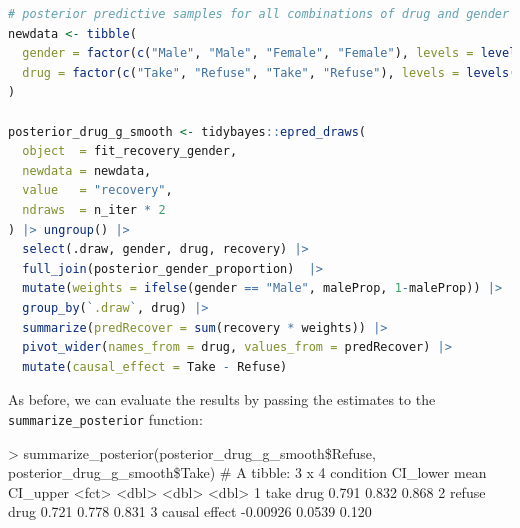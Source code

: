 \documentclass[nobib]{tufte-handout}
\newcommand{\ri}[1]{\mbox{\lstinline{#1}}\xspace}  %
\begin{document}
\begin{minipage}[]{\textwidth}
\begin{lstlisting}[language=R]
# posterior predictive samples for all combinations of drug and gender
newdata <- tibble(
  gender = factor(c("Male", "Male", "Female", "Female"), levels = levels(data_SP_long$gender)),
  drug = factor(c("Take", "Refuse", "Take", "Refuse"), levels = levels(data_SP_long$drug))
)

posterior_drug_g_smooth <- tidybayes::epred_draws(
  object  = fit_recovery_gender,
  newdata = newdata,
  value   = "recovery",
  ndraws  = n_iter * 2
) |> ungroup() |> 
  select(.draw, gender, drug, recovery) |>
  full_join(posterior_gender_proportion)  |> 
  mutate(weights = ifelse(gender == "Male", maleProp, 1-maleProp)) |> 
  group_by(`.draw`, drug) |> 
  summarize(predRecover = sum(recovery * weights)) |> 
  pivot_wider(names_from = drug, values_from = predRecover) |> 
  mutate(causal_effect = Take - Refuse) 
\end{lstlisting}
\end{minipage}

\vspace{-0.5cm}
As before, we can evaluate the results by passing the estimates to the \ri{summarize_posterior} function:

\begin{minipage}[]{\textwidth}
\begin{rc}
> summarize_posterior(posterior_drug_g_smooth\$Refuse, posterior_drug_g_smooth\$Take)
# A tibble: 3 x 4
  condition     CI_lower   mean CI_upper
  <fct>            <dbl>  <dbl>    <dbl>
1 take drug      0.791   0.832     0.868
2 refuse drug    0.721   0.778     0.831
3 causal effect -0.00926 0.0539    0.120
\end{rc}
\end{minipage}
\end{document}
